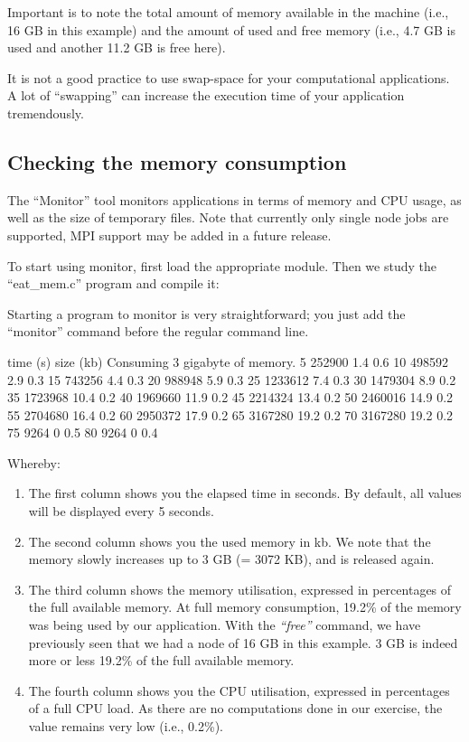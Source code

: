 Important is to note the total amount of memory available in the machine (i.e.,
16 GB in this example) and the amount of used and free memory (i.e., 4.7 GB is
used and another 11.2 GB is free here).

It is not a good practice to use swap-space for your computational
applications. A lot of ``swapping'' can increase the execution time of your
application tremendously.

\subsection{Checking the memory consumption}

\ifgent
\else
The ``Monitor'' tool monitors applications in terms of memory and CPU usage, as
well as the size of temporary files. Note that currently only single node jobs
are supported, MPI support may be added in a future release.

To start using monitor, first load the appropriate module. Then we study the
``eat\_mem.c'' program and compile it:

\begin{prompt}
\end{prompt}


Starting a program to monitor is very straightforward; you just add the
``monitor'' command before the regular command line.

\begin{prompt}
time (s) size (kb) %
Consuming 3 gigabyte of memory.
5  252900 1.4 0.6
10  498592 2.9 0.3
15  743256 4.4 0.3
20  988948 5.9 0.3
25  1233612 7.4 0.3
30  1479304 8.9 0.2
35  1723968 10.4 0.2
40  1969660 11.9 0.2
45  2214324 13.4 0.2
50  2460016 14.9 0.2
55  2704680 16.4 0.2
60  2950372 17.9 0.2
65  3167280 19.2 0.2
70  3167280 19.2 0.2
75  9264  0 0.5
80  9264  0 0.4
\end{prompt}

Whereby:

\begin{enumerate}
\item  The first column shows you the elapsed time in seconds. By default, all
  values will be displayed every 5 seconds.
\item  The second column shows you the used memory in kb. We note that the
  memory slowly increases up to 3 GB (= 3072 KB), and is released again.
\item  The third column shows the memory utilisation, expressed in percentages
  of the full available memory.  At full memory consumption, 19.2\% of the
  memory was being used by our application. With the \emph{``free''} command,
  we have previously seen that we had a node of 16 GB in this example. 3 GB is
  indeed more or less 19.2\% of the full available memory.
\item  The fourth column shows you the CPU utilisation, expressed in
  percentages of a full CPU load. As there are no computations done in our
  exercise, the value remains very low (i.e., 0.2\%).
\end{enumerate}

